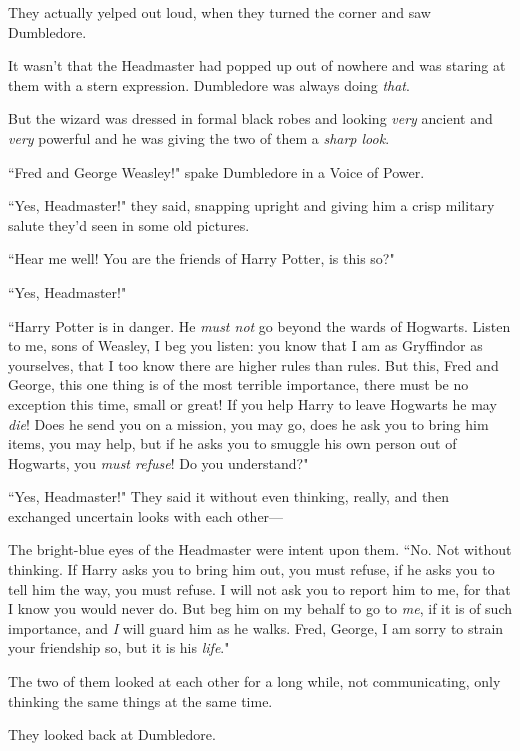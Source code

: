 
They actually yelped out loud, when they turned the corner and saw Dumbledore.

It wasn't that the Headmaster had popped up out of nowhere and was staring at them with a stern expression. Dumbledore was always doing \emph{that}.

But the wizard was dressed in formal black robes and looking \emph{very} ancient and \emph{very} powerful and he was giving the two of them a \emph{sharp look}.

``Fred and George Weasley!" spake Dumbledore in a Voice of Power.

``Yes, Headmaster!" they said, snapping upright and giving him a crisp military salute they'd seen in some old pictures.

``Hear me well! You are the friends of Harry Potter, is this so?"

``Yes, Headmaster!"

``Harry Potter is in danger. He \emph{must not} go beyond the wards of Hogwarts. Listen to me, sons of Weasley, I beg you listen: you know that I am as Gryffindor as yourselves, that I too know there are higher rules than rules. But this, Fred and George, this one thing is of the most terrible importance, there must be no exception this time, small or great! If you help Harry to leave Hogwarts he may \emph{die}! Does he send you on a mission, you may go, does he ask you to bring him items, you may help, but if he asks you to smuggle his own person out of Hogwarts, you \emph{must refuse}! Do you understand?"

``Yes, Headmaster!" They said it without even thinking, really, and then exchanged uncertain looks with each other—

The bright-blue eyes of the Headmaster were intent upon them. ``No. Not without thinking. If Harry asks you to bring him out, you must refuse, if he asks you to tell him the way, you must refuse. I will not ask you to report him to me, for that I know you would never do. But beg him on my behalf to go to \emph{me}, if it is of such importance, and \emph{I} will guard him as he walks. Fred, George, I am sorry to strain your friendship so, but it is his \emph{life}."

The two of them looked at each other for a long while, not communicating, only thinking the same things at the same time.

They looked back at Dumbledore.

